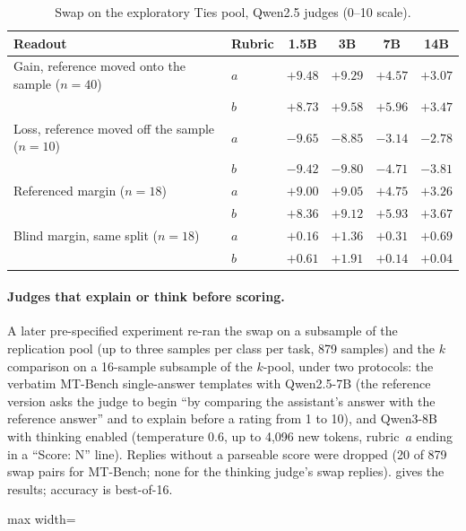\begin{table}[htbp]
\centering
\caption{Swap on the exploratory Ties pool, Qwen2.5 judges (0--10 scale).\pre}
\label{tab:ladder}
\footnotesize
\setlength{\tabcolsep}{4pt}
\begin{tabular}{llcccc}
\toprule
Readout & Rubric & 1.5B & 3B & 7B & 14B \\
\midrule
Gain, reference moved onto the sample ($n{=}40$) & $a$ & $+9.48$ & $+9.29$ & $+4.57$ & $+3.07$ \\
 & $b$ & $+8.73$ & $+9.58$ & $+5.96$ & $+3.47$ \\
Loss, reference moved off the sample ($n{=}10$) & $a$ & $-9.65$ & $-8.85$ & $-3.14$ & $-2.78$ \\
 & $b$ & $-9.42$ & $-9.80$ & $-4.71$ & $-3.81$ \\
Referenced margin ($n{=}18$) & $a$ & $+9.00$ & $+9.05$ & $+4.75$ & $+3.26$ \\
 & $b$ & $+8.36$ & $+9.12$ & $+5.93$ & $+3.67$ \\
Blind margin, same split ($n{=}18$) & $a$ & $+0.16$ & $+1.36$ & $+0.31$ & $+0.69$ \\
 & $b$ & $+0.61$ & $+1.91$ & $+0.14$ & $+0.04$ \\
\bottomrule
\end{tabular}

\end{table}

\paragraph{Judges that explain or think before scoring.}
A later pre-specified experiment re-ran the swap on a subsample of the replication pool (up to three samples per class per task, 879 samples) and the $k$ comparison on a 16-sample subsample of the $k$-pool, under two protocols: the verbatim MT-Bench single-answer templates with Qwen2.5-7B (the reference version asks the judge to begin ``by comparing the assistant's answer with the reference answer'' and to explain before a rating from 1 to 10), and Qwen3-8B with thinking enabled (temperature 0.6, up to 4,096 new tokens, rubric~$a$ ending in a ``Score: N'' line). Replies without a parseable score were dropped (20 of 879 swap pairs for MT-Bench; none for the thinking judge's swap replies).  gives the results; accuracy is best-of-16.

\begin{table}[htbp]
\centering
\caption{Judges that write before scoring: change in score of identical text under the swap (points, 95\% CI).\pre}
\label{tab:r2b}
\footnotesize
\setlength{\tabcolsep}{3pt}
\begin{adjustbox}{max width=\linewidth}\end{adjustbox}

\end{table}

